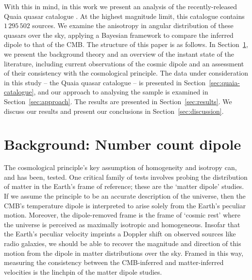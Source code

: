 \documentclass[fleqn,usenatbib]{mnras}
\begin{document}
    With this in mind, in this work we present an analysis of the recently-released Quaia quasar catalogue \citep{storeyfisher2023quaia}.
    At the highest magnitude limit, this catalogue contains $1\,295\,502$ sources.
    We examine the anisotropy in angular distribution of these quasars over the sky, applying a Bayesian framework to compare the inferred dipole to that of the CMB.
    The structure of this paper is as follows.
    In Section~\ref{sec:background}, we present the background theory and an overview of the instant state of the literature, including current observations of the cosmic dipole and an assessment of their consistency with the cosmological principle.
    The data under consideration in this study -- the Quaia quasar catalogue -- is presented in Section~\ref{sec:quaia-catalogue}, and our approach to analysing the sample is examined in Section~\ref{sec:approach}.
    The results are presented in Section~\ref{sec:results}.
    We discuss our results and present our conclusions in Section~\ref{sec:discussion}.

\section{Background: Number count dipole}\label{sec:background}
    The cosmological principle's key assumption of homogeneity and isotropy can, and has been, tested.
    One critical family of tests involves probing the distribution of matter in the Earth's frame of reference; these are the `matter dipole' studies.
    If we assume the principle to be an accurate description of the universe, then the CMB's temperature dipole is interpreted to arise solely from the Earth's peculiar motion.
    Moreover, the dipole-removed frame is the frame of `cosmic rest' where the universe is perceived as maximally isotropic and homogeneous.
    Insofar that the Earth's peculiar velocity imprints a Doppler shift on observed sources like radio galaxies, we should be able to recover the magnitude and direction of this motion from the dipole in matter distributions over the sky.
    Framed in this way, measuring the consistency between the CMB-inferred and matter-inferred velocities is the linchpin of the matter dipole studies.
\end{document}
